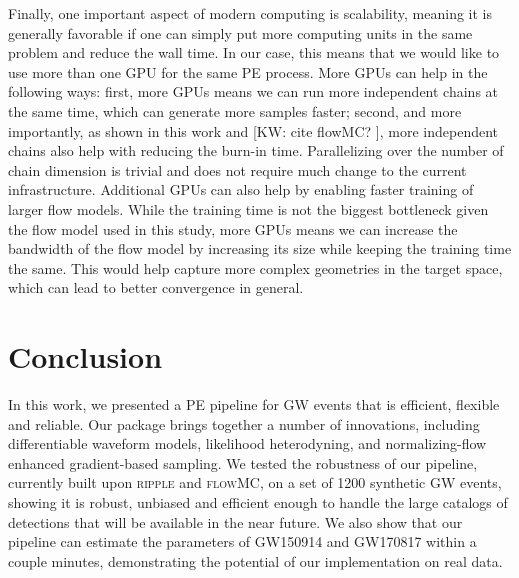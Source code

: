 \documentclass[twocolumn]{aastex631}
\newcommand{\kw}[1]{{\color{rb4}[KW: #1 ]}}
\begin{document}
Finally, one important aspect of modern computing is scalability, meaning it is
generally favorable if one can simply put more computing units in the same
problem and reduce the wall time. In our case, this means that we would like to
use more than one GPU for the same PE process. More GPUs can help in the
following ways: first, more GPUs means we can run more independent chains at
the same time, which can generate more samples faster; second, and more
importantly, as shown in this work and \kw{cite flowMC?}, more independent
chains also help with reducing the burn-in time. Parallelizing over the number
of chain dimension is trivial and does not require much change to the current
infrastructure. Additional GPUs can also help by enabling faster training of
larger flow models. While the training time is not the biggest bottleneck given
the flow model used in this study, more GPUs means we can increase the
bandwidth of the flow model by increasing its size while keeping the training
time the same. This would help capture more complex geometries in the target
space, which can lead to better convergence in general.

\section{Conclusion}

In this work, we presented a PE pipeline for GW events that is efficient,
flexible and reliable. Our package brings together a number of innovations,
including differentiable waveform models, likelihood heterodyning, and
normalizing-flow enhanced gradient-based sampling. We tested the robustness of
our pipeline, currently built upon \textsc{ripple} and \textsc{flowMC}, on a
set of 1200 synthetic GW events, showing it is robust, unbiased and efficient
enough to handle the large catalogs of detections that will be available in the
near future. We also show that our pipeline can estimate the parameters of
GW150914 and GW170817 within a couple minutes, demonstrating the potential of our
implementation on real data.
\end{document}
